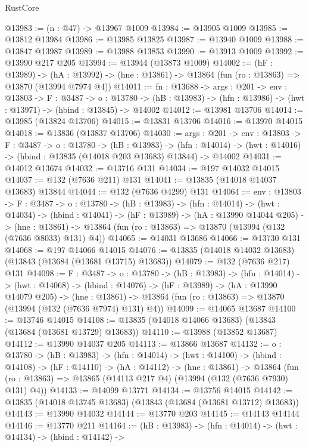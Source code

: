 \begin{lexlean}{RustCore}
\begin{coremodule}
@13983 := (n : @47) -> @13967 @1009
@13984 := @13905 @1009
@13985 := @13812 @13984
@13986 := @13985 @13825
@13987 := @13940 @1009
@13988 := @13847 @13987
@13989 := @13988 @13853
@13990 := @13913 @1009
@13992 := @13990 @217 @205
@13994 := @13944 (@13873 @1009)
@14002 := (hF : @13989) ->
  (hA : @13992) -> (hne : @13861) -> @13864 (fun (ro : @13863) => @13870 (@13994 @7974 @4))
@14011 := {fn : @13688} ->
  {args : @201} ->
  {env : @13803} ->
  {F : @3487} ->
  {o : @13780} -> (hB : @13983) -> (hfn : @13986) -> (hwt : @13971) -> (hbind : @13845) -> @14002
@14012 := @13981 @13706
@14014 := @13985 (@13824 @13706)
@14015 := @13831 @13706
@14016 := @13970 @14015
@14018 := @13836 (@13837 @13706)
@14030 := {args : @201} ->
  {env : @13803} ->
  {F : @3487} ->
  {o : @13780} ->
  (hB : @13983) ->
  (hfn : @14014) -> (hwt : @14016) -> (hbind : @13835 (@14018 @203 @13683) @13844) -> @14002
@14031 := @14012 @13674
@14032 := @13716 @131
@14034 := @197 @14032 @14015
@14037 := @132 (@7636 @211) @131
@14041 := @13835 (@14018 @14037 @13683) @13844
@14044 := @132 (@7636 @4299) @131
@14064 := {env : @13803} ->
  {F : @3487} ->
  {o : @13780} ->
  (hB : @13983) ->
  (hfn : @14014) ->
  (hwt : @14034) ->
  (hbind : @14041) ->
  (hF : @13989) ->
  (hA : @13990 @14044 @205) ->
  (hne : @13861) -> @13864 (fun (ro : @13863) => @13870 (@13994 (@132 (@7636 @8033) @131) @4))
@14065 := @14031 @13686
@14066 := @13730 @131
@14068 := @197 @14066 @14015
@14076 := @13835 (@14018 @14032 @13683) (@13843 (@13684 (@13681 @13715) @13683))
@14079 := @132 (@7636 @217) @131
@14098 := {F : @3487} ->
  {o : @13780} ->
  (hB : @13983) ->
  (hfn : @14014) ->
  (hwt : @14068) ->
  (hbind : @14076) ->
  (hF : @13989) ->
  (hA : @13990 @14079 @205) ->
  (hne : @13861) -> @13864 (fun (ro : @13863) => @13870 (@13994 (@132 (@7636 @7974) @131) @4))
@14099 := @14065 @13687
@14100 := @13746 @14015
@14108 := @13835 (@14018 @14066 @13683) (@13843 (@13684 (@13681 @13729) @13683))
@14110 := @13988 (@13852 @13687)
@14112 := @13990 @14037 @205
@14113 := @13866 @13687
@14132 := {o : @13780} ->
  (hB : @13983) ->
  (hfn : @14014) ->
  (hwt : @14100) ->
  (hbind : @14108) ->
  (hF : @14110) ->
  (hA : @14112) ->
  (hne : @13861) ->
  @13864 (fun (ro : @13863) => @13865 (@14113 @217 @4) (@13994 (@132 (@7636 @7930) @131) @4))
@14133 := @14099 @13771
@14134 := @13756 @14015
@14142 := @13835 (@14018 @13745 @13683) (@13843 (@13684 (@13681 @13712) @13683))
@14143 := @13990 @14032
@14144 := @13770 @203
@14145 := @14143 @14144
@14146 := @13770 @211
@14164 := (hB : @13983) ->
  (hfn : @14014) ->
  (hwt : @14134) ->
  (hbind : @14142) ->

\end{coremodule}
\end{lexlean}
